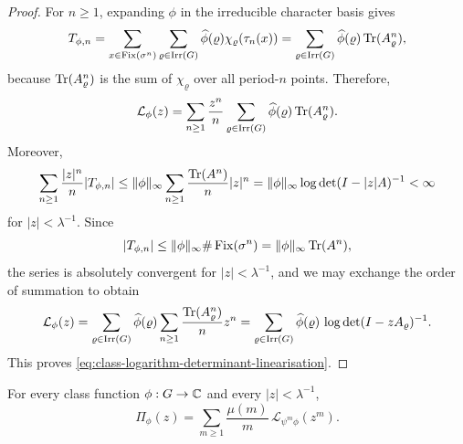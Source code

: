 \begin{proof}
  For \(n\ge 1\), expanding \(\phi\) in the irreducible character basis
  gives
  \[
    T_{\phi,n}
    =\sum_{x\in\operatorname{Fix}(\sigma^n)}
      \sum_{\varrho\in\operatorname{Irr}(G)}
        \widehat\phi(\varrho)\chi_\varrho(\tau_n(x))
    =\sum_{\varrho\in\operatorname{Irr}(G)}
      \widehat\phi(\varrho)\operatorname{Tr}(A_\varrho^n),
  \]
  because \(\operatorname{Tr}(A_\varrho^n)\) is the sum of \(\chi_\varrho\) over all
  period-\(n\) points. Therefore,
  \[
    \mathcal L_\phi(z)
    =\sum_{n\ge 1}\frac{z^n}{n}
      \sum_{\varrho\in\operatorname{Irr}(G)}
        \widehat\phi(\varrho)\operatorname{Tr}(A_\varrho^n).
  \]
  Moreover,
  \[
    \sum_{n\ge 1}\frac{|z|^n}{n}\lvert T_{\phi,n} \rvert
    \le
    \lVert \phi \rVert_\infty
    \sum_{n\ge 1}\frac{\operatorname{Tr}(A^n)}{n}|z|^n
    =
    \lVert \phi \rVert_\infty \log\det(I-|z|A)^{-1}
    <\infty
  \]
  for \(|z|<\lambda^{-1}\). Since
  \[
    \lvert T_{\phi,n} \rvert
    \le \lVert \phi \rVert_\infty \#\operatorname{Fix}(\sigma^n)
    =\lVert \phi \rVert_\infty \operatorname{Tr}(A^n),
  \]
  the series is absolutely convergent for \(|z|<\lambda^{-1}\), and we
  may exchange the order of summation to obtain
  \[
    \mathcal L_\phi(z)
    =
    \sum_{\varrho\in\operatorname{Irr}(G)}
      \widehat\phi(\varrho)
      \sum_{n\ge 1}\frac{\operatorname{Tr}(A_\varrho^n)}{n}z^n
    =
    \sum_{\varrho\in\operatorname{Irr}(G)}
      \widehat\phi(\varrho)\,
      \log\det(I-zA_\varrho)^{-1}.
  \]
  This proves \eqref{eq:class-logarithm-determinant-linearisation}.
\end{proof}

\begin{corollary}
  \label{cor:class-function-adams-mobius}
  For every class function \(\phi:G\to\mathbb{C}\) and every \(|z|<\lambda^{-1}\),
  \begin{equation}\label{eq:class-adams-mobius-inversion}
    \Pi_\phi(z)
    =
    \sum_{m\ge 1}\frac{\mu(m)}{m}\,
      \mathcal L_{\psi^m\phi}(z^m).
  \end{equation}
\end{corollary}

